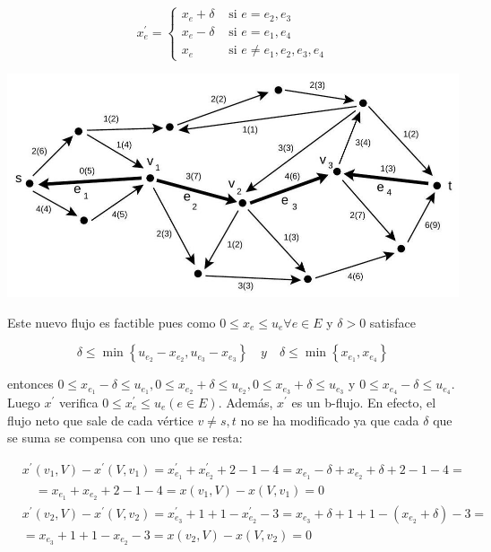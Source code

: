 \documentclass[10pt]{article}
\begin{document}
$$
x_{e}^{\prime}= \begin{cases}x_{e}+\delta & \text { si } e=e_{2}, e_{3} \\ x_{e}-\delta & \text { si } e=e_{1}, e_{4} \\ x_{e} & \text { si } e \neq e_{1}, e_{2}, e_{3}, e_{4}\end{cases}
$$

\begin{center}
\includegraphics[max width=\textwidth]{2025_09_05_aa5f7b8425e7dd302062g-04}
\end{center}

Este nuevo flujo es factible pues como $0 \leq x_{e} \leq u_{e} \forall e \in E$ y $\delta>0$ satisface

$$
\delta \leq \min \left\{u_{e_{2}}-x_{e_{2}}, u_{e_{3}}-x_{e_{3}}\right\} \quad y \quad \delta \leq \min \left\{x_{e_{1}}, x_{e_{4}}\right\}
$$

entonces $0 \leq x_{e_{1}}-\delta \leq u_{e_{1}}, 0 \leq x_{e_{2}}+\delta \leq u_{e_{2}}, 0 \leq x_{e_{3}}+\delta \leq u_{e_{3}}$ y $0 \leq x_{e_{4}}-\delta \leq u_{e_{4}}$.\\
Luego $x^{\prime}$ verifica $0 \leq x_{e}^{\prime} \leq u_{e}(e \in E)$. Además, $x^{\prime}$ es un b-flujo. En efecto, el flujo neto que sale de cada vértice $v \neq s, t$ no se ha modificado ya que cada $\delta$ que se suma se compensa con uno que se resta:

$$
\begin{aligned}
& x^{\prime}\left(v_{1}, V\right)-x^{\prime}\left(V, v_{1}\right)=x_{e_{1}}^{\prime}+x_{e_{2}}^{\prime}+2-1-4=x_{e_{1}}-\delta+x_{e_{2}}+\delta+2-1-4= \\
& \quad=x_{e_{1}}+x_{e_{2}}+2-1-4=x\left(v_{1}, V\right)-x\left(V, v_{1}\right)=0 \\
& x^{\prime}\left(v_{2}, V\right)-x^{\prime}\left(V, v_{2}\right)=x_{e_{3}}^{\prime}+1+1-x_{e_{2}}^{\prime}-3=x_{e_{3}}+\delta+1+1-\left(x_{e_{2}}+\delta\right)-3= \\
& =x_{e_{3}}+1+1-x_{e_{2}}-3=x\left(v_{2}, V\right)-x\left(V, v_{2}\right)=0
\end{aligned}
$$
\end{document}
